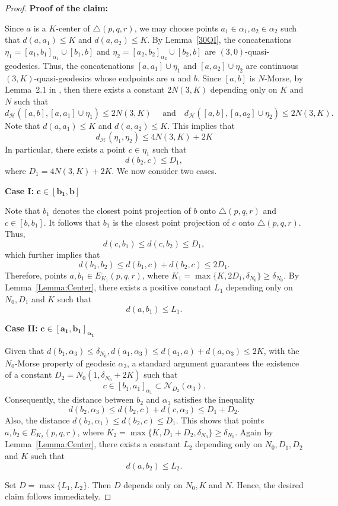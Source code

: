 \documentclass[a4paper,11pt,oneside]{article}
\begin{document}
\begin{proof}
\textbf{Proof of the claim: }

Since $a$ is a $K$-center of $\triangle(p,q,r)$, we may choose points $a_1\in\alpha_1, a_2\in\alpha_2$ such that $d(a,a_1)\le K$ and $
d(a,a_2)\leq K$. By Lemma~\ref{30QI}, the concatenations $\eta_1=[a_1,b_1]_{\alpha_1}\cup[b_1,b]$ and $\eta_2=[a_2,b_2]_{\alpha_2}\cup[b_2,b]$ are $(3,0)$-quasi-geodesics.
Thus, the concatenations $[a, a_1]\cup\eta_1$ and $[a, a_2]\cup\eta_2$ are continuous $(3,K)$-quasi-geodesics whose endpoints are $a$ and $b$. Since $[a, b]$ is $N$-Morse, by Lemma~2.1 in \cite{Cordes17}, 
then there exists a constant $2N(3,K)$ depending only on $K$ and $N$ such that
\[d_{\mathcal{H}}([a, b], [a, a_1]\cup\eta_1)\le 2N(3,K)\quad\text{ and}\quad d_{\mathcal{H}}([a, b], [a, a_2]\cup\eta_2)\le 2N(3,K).\]
Note that $d(a, a_1)\le K$ and $d(a,a_2)\le K$. This implies that 
\[
d_{\mathcal{H}}(\eta_1, \eta_2)\le 4N(3,K)+2K
\]
In particular, there exists a point $c\in\eta_1$ such that \[d(b_2,c)\leq D_1,\]
where $D_1= 4N(3,K)+2K$. We now consider two cases.

\textbf{Case I: }$\boldsymbol{c\in [b_1,b]}$

Note that $b_1$ denotes the closest point projection of $b$ onto $\triangle(p,q,r)$ and $c\in[b, b_1]$. It follows that
  $b_1$ is the closest point projection of $c$ onto $\triangle(p,q,r)$. Thus, 
\[d(c,b_1)\leq d(c, b_2)\leq D_1,\] which further implies that \[d(b_1,b_2)\leq d(b_1,c)+d(b_2,c)\leq 2D_1.\] 
  Therefore, points $a, b_1\in E_{K_1}(p,q,r)$, where $K_1=\max\{K, 2D_1, \delta_{N_0}\}\ge \delta_{N_0}$. By Lemma~\ref{Lemma:Center}, there exists a positive constant $L_1$ depending only on $N_0, D_1$ and $K$ such that
  \[d(a, b_1)\le L_1.\]
 

 \textbf{Case II: } $\boldsymbol{c\in[a_1,b_1]_{\alpha_1}}$ 

Given that $d(b_1, \alpha_3)\le \delta_{N_0}, d(a_1, \alpha_3)\le d(a_1, a)+d(a, \alpha_3)\le 2K$, with the $N_0$-Morse property of geodesic $\alpha_3$, a standard argument guarantees the existence of a constant $D_2=N_0(1, \delta_{N_0}+2K)$ such that 
\[c\in[b_1, a_1]_{\alpha_1}\subset \mathcal{N}_{D_2}(\alpha_3).\]
Consequently, the distance between $b_2$ and $\alpha_3$ satisfies the inequality
\[d(b_2, \alpha_3)\le d(b_2, c)+d(c, \alpha_3)\le D_1+D_2.\]
Also, the distance $d(b_2, \alpha_1)\le d(b_2, c)\le D_1$. This shows that points $a, b_2\in E_{K_2}(p,q,r)$, where $K_2=\max\{K, D_1+D_2, \delta_{N_0}\}\ge \delta_{N_0}$. Again by Lemma~\ref{Lemma:Center}, there exists a constant $L_2$ depending only on $N_0, D_1, D_2$ and $K$ such that 
\[
d(a, b_2)\le L_2.
\]

Set $D=\max\{L_1, L_2\}$. Then $D$ depends only on $N_0, K$ and $N$. Hence, the desired claim follows immediately.

\end{proof}
\end{document}
